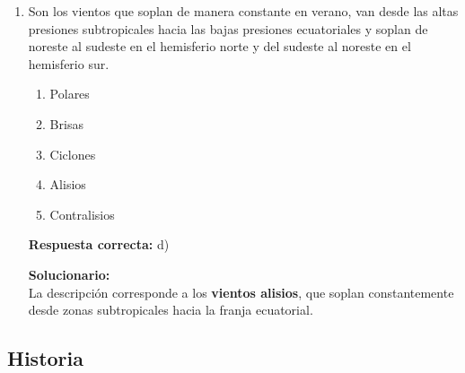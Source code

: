 \begin{enumerate}
	\vspace{2mm}
	\textbf{Solucionario:}\\
	El río formado por los ríos Lampa y Cabanillas es el \textbf{Coata}, que desemboca en la parte norte de la bahía de Chucuito.
	
	
	
	\vspace{6mm}
	
	\item Son los vientos que soplan de manera constante en verano, van desde las altas presiones subtropicales hacia las bajas presiones ecuatoriales y soplan de noreste al sudeste en el hemisferio norte y del sudeste al noreste en el hemisferio sur.
	\begin{enumerate}[label=\alph*)]
		\item Polares
		\item Brisas
		\item Ciclones
		\item Alisios
		\item Contralisios
	\end{enumerate}
	\textbf{Respuesta correcta:} d)
	
	\vspace{2mm}
	\textbf{Solucionario:}\\
	La descripción corresponde a los \textbf{vientos alisios}, que soplan constantemente desde zonas subtropicales hacia la franja ecuatorial.
	

	
	\vspace{6mm}
\end{enumerate}

\subsection*{Historia}

